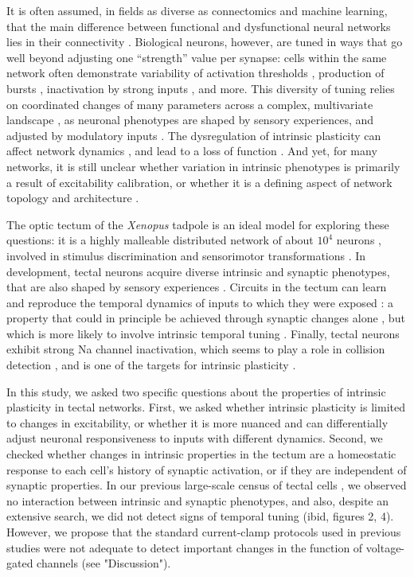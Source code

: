 \documentclass{article}
\begin{document}
It is often assumed, in fields as diverse as connectomics and machine learning, that the main difference between functional and dysfunctional neural networks lies in their connectivity \citep{takemura2014,hildebrand2017,bassett2017network}. Biological neurons, however, are tuned in ways that go well beyond adjusting one “strength” value per synapse: cells within the same network often demonstrate variability of activation thresholds \citep{kole2012}, production of bursts \citep{popovic2011}, inactivation by strong inputs \citep{bianchi2012}, and more. This diversity of tuning relies on coordinated changes of many parameters across a complex, multivariate landscape \citep{oleary2013}, as neuronal phenotypes are shaped by sensory experiences, and adjusted by modulatory inputs \citep{evans2015}. The dysregulation of intrinsic plasticity can affect network dynamics \citep{tien2018}, and lead to a loss of function \citep{marcelin2009}. And yet, for many networks, it is still unclear whether variation in intrinsic phenotypes is primarily a result of excitability calibration, or whether it is a defining aspect of network topology and architecture \citep{titley2017}.

The optic tectum of the \textit{Xenopus} tadpole is an ideal model for exploring these questions: it is a highly malleable distributed network of about $10^4$ neurons \citep{pratt2013}, involved in stimulus discrimination and sensorimotor transformations \citep{dong2009,khakhalin2014}. In development, tectal neurons acquire diverse intrinsic and synaptic phenotypes, that are also shaped by sensory experiences \citep{xu2011,ciarleglio2015}. Circuits in the tectum can learn and reproduce the temporal dynamics of inputs to which they were exposed \citep{pratt2008}: a property that could in principle be achieved through synaptic changes alone \citep{lukovsevivcius2009}, but which is more likely to involve intrinsic temporal tuning \citep{narayanan2008,beatty2014}. Finally, tectal neurons exhibit strong Na channel inactivation, which seems to play a role in collision detection \citep{jang2016}, and is one of the targets for intrinsic plasticity \citep{bianchi2012}.

In this study, we asked two specific questions about the properties of intrinsic plasticity in tectal networks. First, we asked whether intrinsic plasticity is limited to changes in excitability, or whether it is more nuanced and can differentially adjust neuronal responsiveness to inputs with different dynamics. Second, we checked whether changes in intrinsic properties in the tectum are a homeostatic response to each cell's history of synaptic activation, or if they are independent of synaptic properties. In our previous large-scale census of tectal cells \citep{ciarleglio2015}, we observed no interaction between intrinsic and synaptic phenotypes, and also, despite an extensive search, we did not detect signs of temporal tuning (ibid,  figures 2, 4). However, we propose that the standard current-clamp protocols used in previous studies \citep{pratt2007,hamodi2014} were not adequate to detect important changes in the function of voltage-gated channels (see "Discussion"). 
\end{document}

